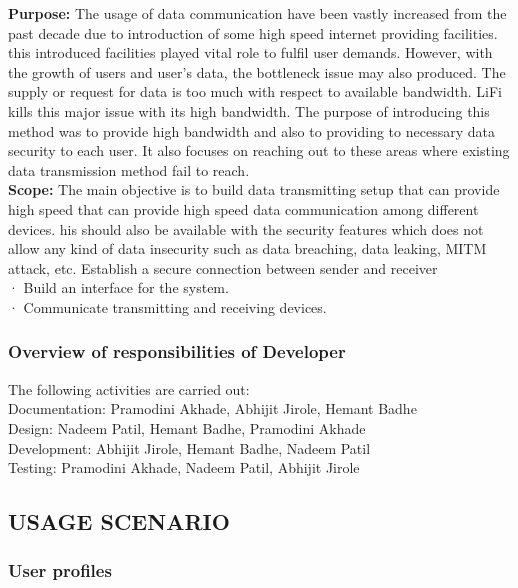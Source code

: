 \documentclass[12pt,a4paper]
{article}
\numberwithin{table}{section}
\begin{document}
{{{{{{\hspace{10 pt}
\textbf{Purpose: }	The usage of data communication have been vastly increased from the past decade due to introduction of some high speed internet providing facilities. this introduced facilities played vital role to fulfil user demands. However, with the growth of users and user's data, the bottleneck issue may also produced. The supply or request for data is too much with respect to available bandwidth. LiFi kills this major issue with its high bandwidth. The purpose of introducing this method was to provide high bandwidth and also to providing to necessary data security to each user. It also focuses on reaching out to these areas where existing data transmission method fail to reach. \\
		
\textbf{Scope:}	The main objective is to build data transmitting setup that can provide high speed that can provide high speed data communication among different devices. his should also be available with the security features which does not allow any kind of data insecurity such as data breaching, data leaking, MITM attack, etc.  Establish a secure connection between sender and receiver\\
· Build an interface for the system.\\
· Communicate transmitting and  receiving devices. \\

\subsubsection{Overview of responsibilities of Developer}
\setlength{\baselineskip}{1.5\baselineskip}
The following activities are carried out: \\
{Documentation}:	Pramodini Akhade, Abhijit Jirole, Hemant Badhe \\
{Design:}		Nadeem Patil, Hemant Badhe, Pramodini Akhade \\
{Development:}		Abhijit Jirole, Hemant Badhe, Nadeem Patil\\
{Testing:}		Pramodini Akhade, Nadeem Patil, Abhijit Jirole \\


\subsection{USAGE SCENARIO}
\subsubsection{User profiles}

}}}}}}
\end{document}
